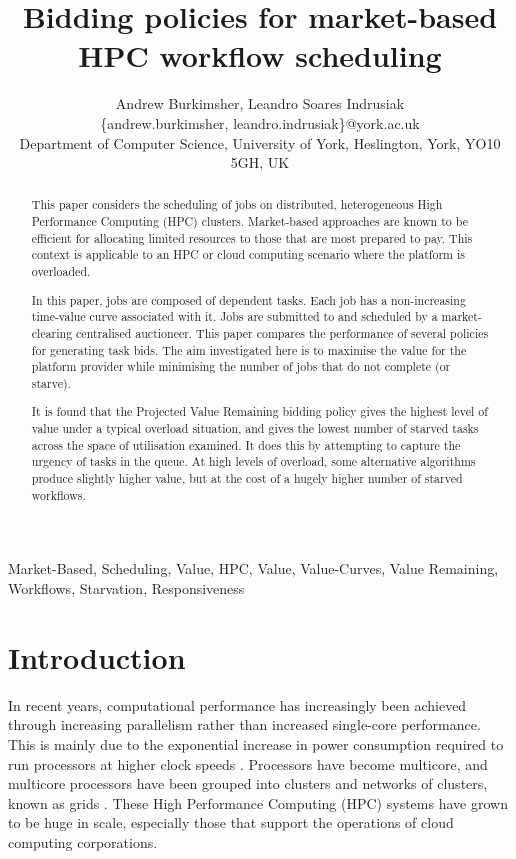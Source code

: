 \documentclass[english,british]{IEEEtran}
\begin{document}
\title{Bidding policies for market-based HPC workflow scheduling}


\author{Andrew Burkimsher, Leandro Soares Indrusiak\\\{andrew.burkimsher, leandro.indrusiak\}@york.ac.uk\\ Department of Computer Science, University of York, Heslington, York, YO10 5GH, UK}
\maketitle
\begin{abstract}
This paper considers the scheduling of jobs on distributed, heterogeneous
High Performance Computing (HPC) clusters. Market-based approaches
are known to be efficient for allocating limited resources to those
that are most prepared to pay. This context is applicable to an HPC
or cloud computing scenario where the platform is overloaded. 

In this paper, jobs are composed of dependent tasks. Each job has
a non-increasing time-value curve associated with it. Jobs are submitted
to and scheduled by a market-clearing centralised auctioneer. This
paper compares the performance of several policies for generating
task bids. The aim investigated here is to maximise the value for
the platform provider while minimising the number of jobs that do
not complete (or starve).

It is found that the Projected Value Remaining bidding policy gives
the highest level of value under a typical overload situation, and
gives the lowest number of starved tasks across the space of utilisation
examined. It does this by attempting to capture the urgency of tasks
in the queue. At high levels of overload, some alternative algorithms
produce slightly higher value, but at the cost of a hugely higher
number of starved workflows. \end{abstract}

\begin{IEEEkeywords}
Market-Based, Scheduling, Value, HPC, Value, Value-Curves, Value Remaining,
Workflows, Starvation, Responsiveness
\end{IEEEkeywords}


\section{Introduction}

In recent years, computational performance has increasingly been achieved
through increasing parallelism rather than increased single-core performance.
This is mainly due to the exponential increase in power consumption
required to run processors at higher clock speeds \cite{intel04}.
Processors have become multicore, and multicore processors have been
grouped into clusters and networks of clusters, known as grids \cite{kesselman98}.
These High Performance Computing (HPC) systems have grown to be huge
in scale, especially those that support the operations of cloud computing
corporations.
\end{document}
